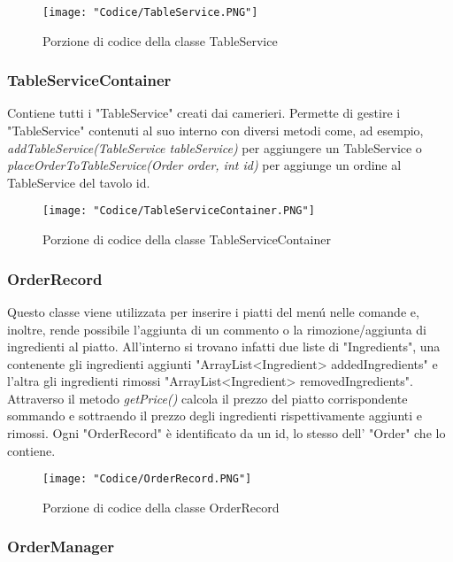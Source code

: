 \documentclass{article}
\begin{document}
\begin{figure}[!h]
\centering
\texttt{[image: "Codice/TableService.PNG"]}
\caption{Porzione di codice della classe TableService}
\end{figure}

\subsubsection{TableServiceContainer}

Contiene tutti i "TableService" creati dai camerieri. Permette di gestire i "TableService" contenuti al suo interno con diversi metodi come, ad esempio, \textit{addTableService(TableService tableService)} per aggiungere un TableService o \textit{placeOrderToTableService(Order order, int id)} per aggiunge un ordine al TableService del tavolo id.

\begin{figure}[!h]
\centering
\texttt{[image: "Codice/TableServiceContainer.PNG"]}
\caption{Porzione di codice della classe TableServiceContainer}
\end{figure}

\newpage

\subsubsection{OrderRecord}

Questo classe viene utilizzata per inserire i piatti del men\'u nelle comande e, inoltre, rende possibile l'aggiunta di un commento o la rimozione/aggiunta di ingredienti al piatto. All'interno si trovano infatti due liste di "Ingredients", una contenente gli ingredienti aggiunti "ArrayList<Ingredient> addedIngredients" e l'altra gli ingredienti rimossi "ArrayList<Ingredient> removedIngredients". Attraverso il metodo \textit{getPrice()} calcola il prezzo del piatto corrispondente sommando e sottraendo il prezzo degli ingredienti rispettivamente aggiunti e rimossi. Ogni "OrderRecord" è identificato da un id, lo stesso dell' "Order" che lo contiene.


\begin{figure}[!h]
\centering
\texttt{[image: "Codice/OrderRecord.PNG"]}
\caption{Porzione di codice della classe OrderRecord}
\end{figure}

\newpage

\subsubsection{OrderManager}
\end{document}
